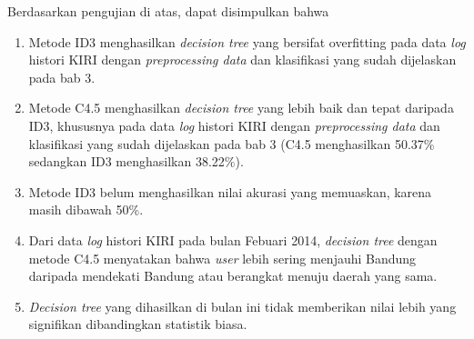 Berdasarkan pengujian di atas, dapat disimpulkan bahwa 

\begin{enumerate}
	\item Metode ID3 menghasilkan \textsl{decision tree} yang bersifat overfitting pada data \textsl{log} histori KIRI dengan  \textsl{preprocessing data} dan klasifikasi yang sudah dijelaskan pada bab 3.
	\item Metode C4.5 menghasilkan \textsl{decision tree} yang lebih baik dan tepat daripada ID3, khususnya pada data \textsl{log} histori KIRI dengan \textsl{preprocessing data} dan klasifikasi yang sudah dijelaskan pada bab 3 (C4.5 menghasilkan 50.37\% sedangkan ID3 menghasilkan 38.22\%).
	\item Metode ID3 belum menghasilkan nilai akurasi yang memuaskan, karena masih dibawah 50\%.
	\item Dari data \textsl{log} histori KIRI pada bulan Febuari 2014, \textsl{decision tree} dengan metode C4.5 menyatakan bahwa \textsl{user} lebih sering menjauhi Bandung daripada mendekati Bandung atau berangkat menuju daerah yang sama.
	\item \textsl{Decision tree} yang dihasilkan di bulan ini tidak memberikan nilai lebih yang signifikan dibandingkan statistik biasa.
\end{enumerate}













